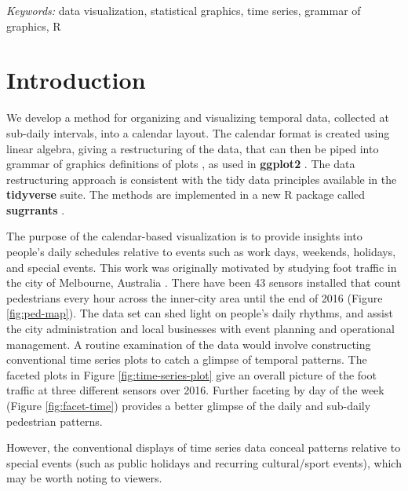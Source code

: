 \documentclass[12pt]{article}
\begin{document}
\noindent%
{\it Keywords:} data visualization, statistical graphics, time series, grammar of graphics, R
\vfill

\newpage
{} %

\hypertarget{introduction}{%
\section{Introduction}\label{introduction}}

We develop a method for organizing and visualizing temporal data,
collected at sub-daily intervals, into a calendar layout. The calendar
format is created using linear algebra, giving a restructuring of the
data, that can then be piped into grammar of graphics definitions of
plots \citep{wilkinson2006grammar, wickham2009ggplot2}, as used in
\textbf{ggplot2} \citep{R-ggplot2}. The data restructuring approach is
consistent with the tidy data principles available in the
\textbf{tidyverse} \citep{R-tidyverse} suite. The methods are
implemented in a new R package called \textbf{sugrrants}
\citep{R-sugrrants}.

The purpose of the calendar-based visualization is to provide insights
into people's daily schedules relative to events such as work days,
weekends, holidays, and special events. This work was originally
motivated by studying foot traffic in the city of Melbourne, Australia
\citep{ped}. There have been 43 sensors installed that count pedestrians
every hour across the inner-city area until the end of 2016 (Figure
\ref{fig:ped-map}). The data set can shed light on people's daily
rhythms, and assist the city administration and local businesses with
event planning and operational management. A routine examination of the
data would involve constructing conventional time series plots to catch
a glimpse of temporal patterns. The faceted plots in Figure
\ref{fig:time-series-plot} give an overall picture of the foot traffic
at three different sensors over 2016. Further faceting by day of the
week (Figure \ref{fig:facet-time}) provides a better glimpse of the
daily and sub-daily pedestrian patterns.

However, the conventional displays of time series data conceal patterns
relative to special events (such as public holidays and recurring
cultural/sport events), which may be worth noting to viewers.
\end{document}
